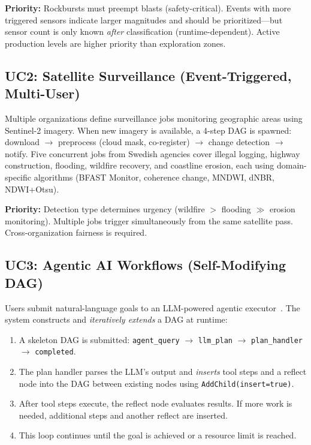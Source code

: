 \documentclass[conference]{IEEEtran}
\begin{document}
\textbf{Priority:} Rockbursts must preempt blasts (safety-critical). Events with more triggered sensors indicate larger magnitudes and should be prioritized---but sensor count is only known \emph{after} classification (runtime-dependent). Active production levels are higher priority than exploration zones.

\subsection{UC2: Satellite Surveillance (Event-Triggered, Multi-User)}
\label{sec:uc2}

Multiple organizations define surveillance jobs monitoring geographic areas using Sentinel-2 imagery. When new imagery is available, a 4-step DAG is spawned: download $\rightarrow$ preprocess (cloud mask, co-register) $\rightarrow$ change detection $\rightarrow$ notify. Five concurrent jobs from Swedish agencies cover illegal logging, highway construction, flooding, wildfire recovery, and coastline erosion, each using domain-specific algorithms (BFAST Monitor, coherence change, MNDWI, dNBR, NDWI+Otsu).

\textbf{Priority:} Detection type determines urgency (wildfire $>$ flooding $\gg$ erosion monitoring). Multiple jobs trigger simultaneously from the same satellite pass. Cross-organization fairness is required.

\subsection{UC3: Agentic AI Workflows (Self-Modifying DAG)}
\label{sec:uc3}

Users submit natural-language goals to an LLM-powered agentic executor~\cite{colonyos}. The system constructs and \emph{iteratively extends} a DAG at runtime:

\begin{enumerate}
    \item A skeleton DAG is submitted: \texttt{agent\_query} $\rightarrow$ \texttt{llm\_plan} $\rightarrow$ \texttt{plan\_handler} $\rightarrow$ \texttt{completed}.
    \item The plan handler parses the LLM's output and \emph{inserts} tool steps and a reflect node into the DAG between existing nodes using \texttt{AddChild(insert=true)}.
    \item After tool steps execute, the reflect node evaluates results. If more work is needed, additional steps and another reflect are inserted.
    \item This loop continues until the goal is achieved or a resource limit is reached.
\end{enumerate}
\end{document}
